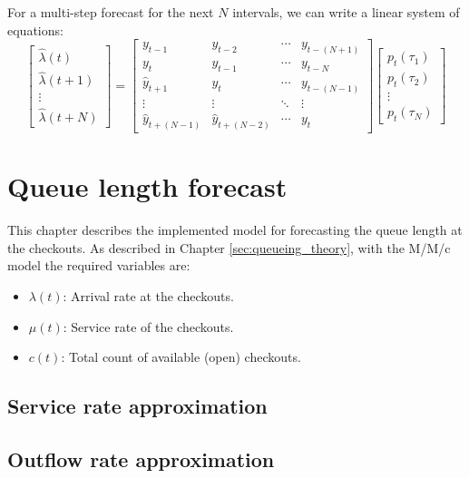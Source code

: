For a multi-step forecast for the next \( N \) intervals, we can write a linear system of equations:
\[
  \begin{bmatrix}\hat{\lambda}(t) \\ \hat{\lambda}(t+1) \\ \vdots \\ \hat{\lambda}(t+N)\end{bmatrix}
  =
  \begin{bmatrix}
    y_{t-1}           & y_{t-2}           & \cdots & y_{t-(N+1)} \\
    y_{t}             & y_{t-1}           & \cdots & y_{t-N}     \\
    \hat{y}_{t+1}     & y_{t}             & \cdots & y_{t-(N-1)} \\
    \vdots            & \vdots            & \ddots & \vdots      \\
    \hat{y}_{t+(N-1)} & \hat{y}_{t+(N-2)} & \cdots & y_{t}
  \end{bmatrix}
  \begin{bmatrix}p_t(\tau_1) \\ p_t(\tau_2) \\ \vdots \\ p_t(\tau_N)\end{bmatrix}
\]

\section{Queue length forecast}
\label{sec:queue_length_forecasting}
This chapter describes the implemented model for forecasting the queue length at the checkouts. As described in Chapter \ref{sec:queueing_theory}, with the M/M/c model the required variables are:
\begin{itemize}
  \item \( \lambda(t) \): Arrival rate at the checkouts.
  \item \( \mu(t) \): Service rate of the checkouts.
  \item \( c(t) \): Total count of available (open) checkouts.
\end{itemize}

\subsection{Service rate approximation}
\label{subsec:service_rate_approximation}


\subsection{Outflow rate approximation}
\label{subsec:outflow_rate_approximation}


